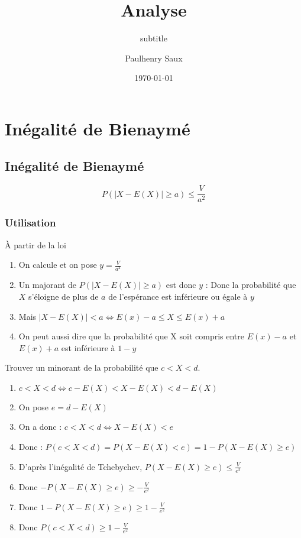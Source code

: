 \documentclass[french, logo]{yLectureNote}
\title{Analyse}
\subtitle{subtitle}
\author{Paulhenry Saux}
\date{\today}
\begin{document}
\titleOne

	\yTableOfContent

\setcounter{chapter}{17}
	\chapter{Inégalité de Bienaymé}


	\printMarginPartialToc

\section{Inégalité de Bienaymé}
\begin{theorem}[Définition]
\[P(|X-E(X)|\geq a) \leq \frac{V}{a^2}\]
\end{theorem}

\subsection{Utilisation}
À partir de la loi
\begin{enumerate}
 \item On calcule et on pose $y = \frac{V}{a^2}$
 \item Un majorant de $P(|X-E(X)|\geq a)$ est donc $y$ : Donc la probabilité que $X$ s'éloigne de plus de $a$ de l'espérance est inférieure ou égale à $y$
 \item Mais $|X-E(X)| < a \iff E(x)-a \leq X \leq E(x)+a$
 \item On peut aussi dire que la probabilité que X soit compris entre $E(x)-a$ et $E(x)+a$ est inférieure à $1-y$
\end{enumerate}
Trouver un minorant de la probabilité que $c<X<d$.
\begin{enumerate}
 \item $c<X<d \iff c-E(X)<X-E(X)<d-E(X)$
 \item On pose $e = d-E(X)$
 \item On a donc : $c<X<d \iff X-E(X)<e$
 \item Donc : $P(c<X<d) = P(X-E(X)<e) = 1-P(X-E(X)\geq e)$
 \item D'après l'inégalité de Tchebychev, $P(X-E(X)\geq e) \leq \frac{V}{e^2}$
 \item Donc $-P(X-E(X)\geq e) \geq -\frac{V}{e^2}$
 \item Donc $1-P(X-E(X)\geq e) \geq 1-\frac{V}{e^2}$
 \item Donc $P(c<X<d) \geq 1-\frac{V}{e^2}$
\end{enumerate}
\end{document}

